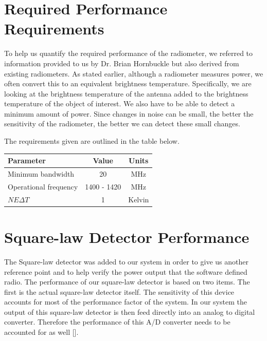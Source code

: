 \section{Required Performance Requirements}

To help us quantify the required performance of the radiometer, we referred to information provided to us by Dr. Brian Hornbuckle but also derived from existing radiometers.  As stated earlier, although a radiometer measures power, we often convert this to an equivalent brightness temperature.  Specifically, we are looking at the brightness temperature of the antenna added to the brightness temperature of the object of interest.  We also have to be able to detect a minimum amount of power.  Since changes in noise can be small, the better the sensitivity of the radiometer, the better we can detect these small changes.  

The requirements given are outlined in the table below.

\begin{table}[h!tb] \centering
{}
\label{rad_performance}
\begin{tabular}{lcc} \hline
\textbf{Parameter} & \textbf{Value} & \textbf{Units} \\ \hline
Minimum bandwidth & 20 & MHz \\
Operational frequency & 1400 - 1420 & MHz \\
$NE\Delta T$ & 1 & Kelvin \\ \hline
\end{tabular}
\end{table}

\section{Square-law Detector Performance}
The Square-law detector was added to our system in order to give us another reference point and to help verify the power output that the software defined radio.  The performance of our square-law detector is based on two items.  The first is the actual square-law detector itself.  The sensitivity of this device accounts for most of the performance factor of the system.  In our system the output of this square-law detector is then feed directly into an analog to digital converter.  Therefore the performance of this A/D converter needs to be accounted for as well [\cite{Terlep}].  

